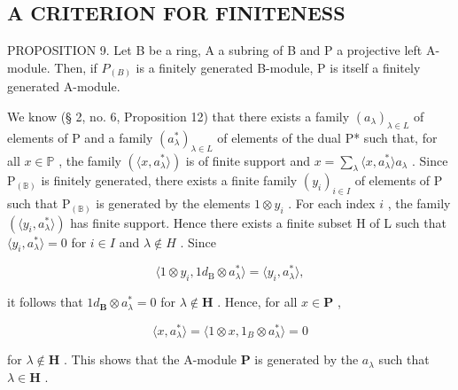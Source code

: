 \subsection{A CRITERION FOR FINITENESS}

PROPOSITION 9. Let B be a ring, A a subring of B and P a projective left A-module. Then, if \(P_{(B)}\) is a finitely generated B-module, P is itself a finitely generated A-module.

We know (§ 2, no. 6, Proposition 12) that there exists a family \((a_{\lambda})_{\lambda \in L}\) of elements of P and a family \((a_{\lambda}^{*})_{\lambda \in L}\) of elements of the dual P* such that, for all \(x \in \mathbb{P}\) , the family \((\langle x, a_{\lambda}^{*} \rangle)\) is of finite support and \(x = \sum_{\lambda} \langle x, a_{\lambda}^{*} \rangle a_{\lambda}\) . Since \(\mathrm{P}_{(\mathbb{B})}\) is finitely generated, there exists a finite family \((y_{i})_{i \in I}\) of elements of P such that \(\mathrm{P}_{(\mathbb{B})}\) is generated by the elements \(1 \otimes y_{i}\) . For each index \(i\) , the family \((\langle y_{i}, a_{\lambda}^{*} \rangle)\) has finite support. Hence there exists a finite subset H of L such that \(\langle y_{i}, a_{\lambda}^{*} \rangle = 0\) for \(i \in I\) and \(\lambda \notin H\) . Since

\[
\langle 1 \otimes y _ {i}, 1 d _ {\mathrm{B}} \otimes a _ {\lambda} ^ {*} \rangle = \langle y _ {i}, a _ {\lambda} ^ {*} \rangle ,
\]

it follows that \(1d_{\mathbf{B}} \otimes a_{\lambda}^{*} = 0\) for \(\lambda \notin \mathbf{H}\) . Hence, for all \(x \in \mathbf{P}\) ,

\[
\langle x, a _ {\lambda} ^ {*} \rangle = \langle 1 \otimes x, 1 _ {B} \otimes a _ {\lambda} ^ {*} \rangle = 0
\]

for \(\lambda \notin \mathbf{H}\) . This shows that the A-module \(\mathbf{P}\) is generated by the \(a_{\lambda}\) such that \(\lambda \in \mathbf{H}\) .

